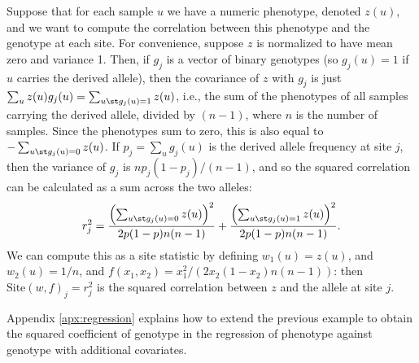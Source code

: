 \documentclass{article}
\newcommand{\site}{\mbox{Site}} %
\newcommand{\iw}{w} %
\begin{document}
\begin{example} \label{ex:site_correlations}
    Suppose that for each sample $u$ we have a numeric phenotype, denoted $z(u)$,
    and we want to compute the correlation between this phenotype
    and the genotype at each site.
    For convenience, suppose $z$ is normalized
    to have mean zero and variance 1.
    Then, if $g_j$ is a vector of binary genotypes (so $g_j(u) = 1$ if $u$ carries the derived allele),
    then the covariance of $z$ with $g_j$ is just $\sum_u z(u) g_j(u) = \sum_{u \st g_j(u) = 1} z(u)$,
    i.e., the sum of the phenotypes of all samples carrying the derived allele,
    divided by $(n - 1)$, where $n$ is the number of samples.
    Since the phenotypes sum to zero, this is also equal to
    $- \sum_{u \st g_j(u) = 0} z(u)$.
    If $p_j = \sum_u g_j(u)$ is the derived allele frequency at site $j$,
    then the variance of $g_j$ is $n p_j (1-p_j) / (n-1)$,
    and so the squared correlation can be calculated as a sum across the two alleles:
    \begin{align*}
        r_j^2 =
        \frac{\left( \sum_{u \st g_j(u) = 0} z(u)\right)^2}{2p(1-p)n(n-1)}
        + \frac{\left( \sum_{u \st g_j(u) = 1} z(u)\right)^2}{2p(1-p)n(n-1)}  .
    \end{align*}
    We can compute this as a site statistic by defining $\iw_{1}(u) = z(u)$, and $\iw_{2}(u) = 1/n$,
    and $f(x_1, x_2) = x_1^2 / (2 x_2 (1 - x_2) n (n-1))$:
    then $\site(\iw, f)_j = r_j^2$ is the squared correlation between $z$ and the allele at site $j$.
\end{example}

Appendix \ref{apx:regression} explains how to extend the previous example
to obtain the squared coefficient of genotype in the regression of phenotype
against genotype with additional covariates.
\end{document}
